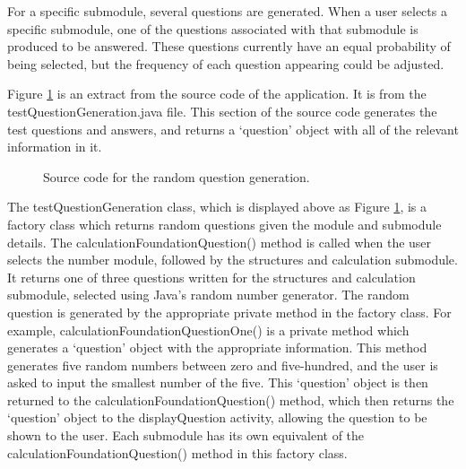 \documentclass{article}
\begin{document}
For a specific submodule, several questions are generated. When a user selects a specific submodule, one of the questions associated with that submodule is produced to be answered. These questions currently have an equal probability of being selected, but the frequency of each question appearing could be adjusted. \par

Figure \ref{figure:testQuestionGeneration} is an extract from the source code of the application. It is from the testQuestionGeneration.java file. This section of the source code generates the test questions and answers, and returns a `question' object with all of the relevant information in it. 

\begin{figure}[H]
	\centering
	\caption{Source code for the random question generation.}
	\label{figure:testQuestionGeneration}
\end{figure}

The testQuestionGeneration class, which is displayed above as Figure \ref{figure:testQuestionGeneration}, is a factory class which returns random questions given the module and submodule details. The calculationFoundationQuestion() method is called when the user selects the number module, followed by the structures and calculation submodule. It returns one of three questions written for the structures and calculation submodule, selected using Java's random number generator. The random question is generated by the appropriate private method in the factory class. For example, calculationFoundationQuestionOne() is a private method which generates a `question' object with the appropriate information. This method generates five random numbers between zero and five-hundred, and the user is asked to input the smallest number of the five. This `question' object is then returned to the calculationFoundationQuestion() method, which then returns the `question' object to the displayQuestion activity, allowing the question to be shown to the user. Each submodule has its own equivalent of the calculationFoundationQuestion() method in this factory class. \par
\end{document}
